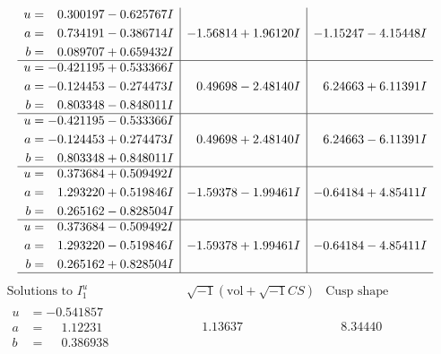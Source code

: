 \documentclass[1p]{elsarticle_modified}
\theoremstyle{definition}
\newcommand{\I}{\sqrt{-1}}
\begin{document}
$$\begin{array}{c|c|c}
\begin{aligned}
u &= \phantom{-}0.300197 - 0.625767 I \\
a &= \phantom{-}0.734191 - 0.386714 I \\
b &= \phantom{-}0.089707 + 0.659432 I\end{aligned}
 & -1.56814 + 1.96120 I & -1.15247 - 4.15448 I \\ \hline\begin{aligned}
u &= -0.421195 + 0.533366 I \\
a &= -0.124453 - 0.274473 I \\
b &= \phantom{-}0.803348 - 0.848011 I\end{aligned}
 & \phantom{-}0.49698 - 2.48140 I & \phantom{-}6.24663 + 6.11391 I \\ \hline\begin{aligned}
u &= -0.421195 - 0.533366 I \\
a &= -0.124453 + 0.274473 I \\
b &= \phantom{-}0.803348 + 0.848011 I\end{aligned}
 & \phantom{-}0.49698 + 2.48140 I & \phantom{-}6.24663 - 6.11391 I \\ \hline\begin{aligned}
u &= \phantom{-}0.373684 + 0.509492 I \\
a &= \phantom{-}1.293220 + 0.519846 I \\
b &= \phantom{-}0.265162 - 0.828504 I\end{aligned}
 & -1.59378 - 1.99461 I & -0.64184 + 4.85411 I \\ \hline\begin{aligned}
u &= \phantom{-}0.373684 - 0.509492 I \\
a &= \phantom{-}1.293220 - 0.519846 I \\
b &= \phantom{-}0.265162 + 0.828504 I\end{aligned}
 & -1.59378 + 1.99461 I & -0.64184 - 4.85411 I\\
 \hline 
 \end{array}$$\newpage$$\begin{array}{c|c|c}  
\text{Solutions to }I^u_{1}& \I (\text{vol} + \sqrt{-1}CS) & \text{Cusp shape}\\
 \hline 
\begin{aligned}
u &= -0.541857\phantom{ +0.000000I} \\
a &= \phantom{-}1.12231\phantom{ +0.000000I} \\
b &= \phantom{-}0.386938\phantom{ +0.000000I}\end{aligned}
 & \phantom{-}1.13637\phantom{ +0.000000I} & \phantom{-}8.34440\phantom{ +0.000000I} \\ \hline\begin{aligned}

\end{aligned}
\end{array}$$
\end{document}
